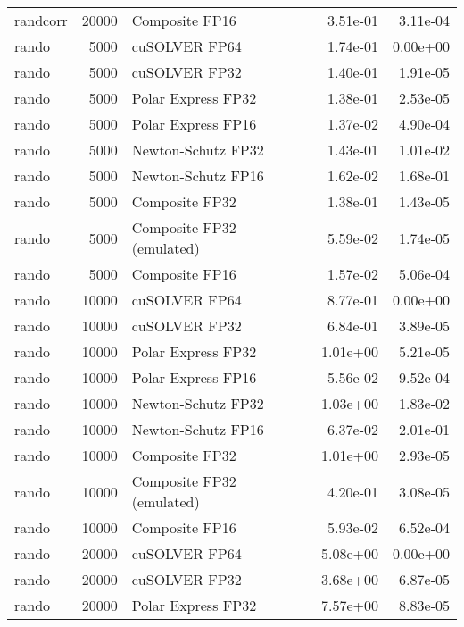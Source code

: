 \begin{table}
\begin{tabular}{lrlrr}
 randcorr & 20000 &            Composite FP16 &  3.51e-01 &        3.11e-04 \\
    rando &  5000 &             cuSOLVER FP64 &  1.74e-01 &        0.00e+00 \\
    rando &  5000 &             cuSOLVER FP32 &  1.40e-01 &        1.91e-05 \\
    rando &  5000 &        Polar Express FP32 &  1.38e-01 &        2.53e-05 \\
    rando &  5000 &        Polar Express FP16 &  1.37e-02 &        4.90e-04 \\
    rando &  5000 &        Newton-Schutz FP32 &  1.43e-01 &        1.01e-02 \\
    rando &  5000 &        Newton-Schutz FP16 &  1.62e-02 &        1.68e-01 \\
    rando &  5000 &            Composite FP32 &  1.38e-01 &        1.43e-05 \\
    rando &  5000 & Composite FP32 (emulated) &  5.59e-02 &        1.74e-05 \\
    rando &  5000 &            Composite FP16 &  1.57e-02 &        5.06e-04 \\
    rando & 10000 &             cuSOLVER FP64 &  8.77e-01 &        0.00e+00 \\
    rando & 10000 &             cuSOLVER FP32 &  6.84e-01 &        3.89e-05 \\
    rando & 10000 &        Polar Express FP32 &  1.01e+00 &        5.21e-05 \\
    rando & 10000 &        Polar Express FP16 &  5.56e-02 &        9.52e-04 \\
    rando & 10000 &        Newton-Schutz FP32 &  1.03e+00 &        1.83e-02 \\
    rando & 10000 &        Newton-Schutz FP16 &  6.37e-02 &        2.01e-01 \\
    rando & 10000 &            Composite FP32 &  1.01e+00 &        2.93e-05 \\
    rando & 10000 & Composite FP32 (emulated) &  4.20e-01 &        3.08e-05 \\
    rando & 10000 &            Composite FP16 &  5.93e-02 &        6.52e-04 \\
    rando & 20000 &             cuSOLVER FP64 &  5.08e+00 &        0.00e+00 \\
    rando & 20000 &             cuSOLVER FP32 &  3.68e+00 &        6.87e-05 \\
    rando & 20000 &        Polar Express FP32 &  7.57e+00 &        8.83e-05 \\

\end{tabular}
\end{table}
